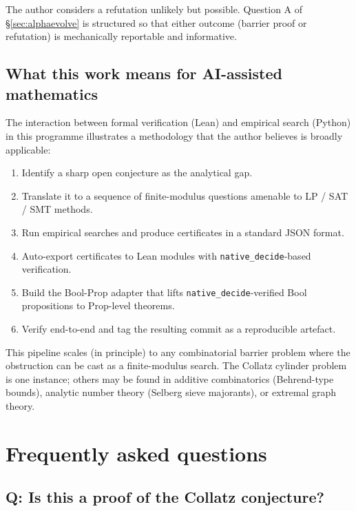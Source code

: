 \documentclass[11pt,a4paper]{article}
\theoremstyle{plain}
\theoremstyle{definition}
\begin{document}
The author considers a refutation unlikely but possible. Question
A of \S\ref{sec:alphaevolve} is structured so that either
outcome (barrier proof or refutation) is mechanically reportable
and informative.

\subsection{What this work means for AI-assisted mathematics}

The interaction between formal verification (Lean) and empirical
search (Python) in this programme illustrates a methodology that
the author believes is broadly applicable:

\begin{enumerate}
   \item Identify a sharp open conjecture as the analytical gap.
   \item Translate it to a sequence of finite-modulus
         questions amenable to LP / SAT / SMT methods.
   \item Run empirical searches and produce certificates in a
         standard JSON format.
   \item Auto-export certificates to Lean modules with
         \texttt{native\_decide}-based verification.
   \item Build the Bool-Prop adapter that lifts
         \texttt{native\_decide}-verified Bool propositions to
         Prop-level theorems.
   \item Verify end-to-end and tag the resulting commit as a
         reproducible artefact.
\end{enumerate}

This pipeline scales (in principle) to any combinatorial barrier
problem where the obstruction can be cast as a finite-modulus
search. The Collatz cylinder problem is one instance; others may
be found in additive combinatorics (Behrend-type bounds),
analytic number theory (Selberg sieve majorants), or extremal
graph theory.

\section{Frequently asked questions}\label{app:faq}

\subsection*{Q: Is this a proof of the Collatz conjecture?}
\end{document}
